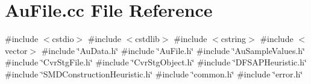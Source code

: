 \section{Au\+File.\+cc File Reference}
\label{AuFile_8cc}
{\ttfamily \#include $<$cstdio$>$}\newline
{\ttfamily \#include $<$cstdlib$>$}\newline
{\ttfamily \#include $<$cstring$>$}\newline
{\ttfamily \#include $<$vector$>$}\newline
{\ttfamily \#include \char`\"{}Au\+Data.\+h\char`\"{}}\newline
{\ttfamily \#include \char`\"{}Au\+File.\+h\char`\"{}}\newline
{\ttfamily \#include \char`\"{}Au\+Sample\+Values.\+h\char`\"{}}\newline
{\ttfamily \#include \char`\"{}Cvr\+Stg\+File.\+h\char`\"{}}\newline
{\ttfamily \#include \char`\"{}Cvr\+Stg\+Object.\+h\char`\"{}}\newline
{\ttfamily \#include \char`\"{}D\+F\+S\+A\+P\+Heuristic.\+h\char`\"{}}\newline
{\ttfamily \#include \char`\"{}S\+M\+D\+Construction\+Heuristic.\+h\char`\"{}}\newline
{\ttfamily \#include \char`\"{}common.\+h\char`\"{}}\newline
{\ttfamily \#include \char`\"{}error.\+h\char`\"{}}\newline
